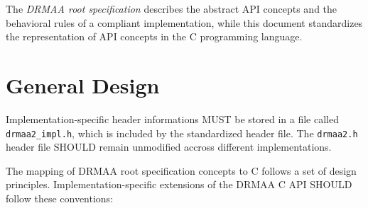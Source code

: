 \documentclass{article}
\newcommand{\h}[1]{\texttt{#1}}
\begin{document}
The \emph{DRMAA root specification} \cite{gfd194} describes the abstract API concepts and the behavioral rules of a compliant implementation, while this document standardizes the representation of API concepts in the C programming language.

\section{General Design}
\label{sec:concepts}

Implementation-specific header informations MUST be stored in a file called \h{drmaa2\_impl.h}, which is included by the standardized header file. The \h{drmaa2.h} header file SHOULD remain unmodified accross different implementations.

The mapping of DRMAA root specification concepts to C follows a set of design principles. Implementation-specific extensions of the DRMAA C API SHOULD follow these conventions:
\end{document}
